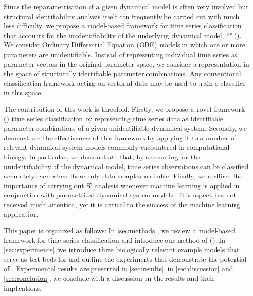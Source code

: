 Since the reparametrisation of a given dynamical model is often very involved but structural identifiability analysis itself can frequently be carried out with much less difficulty, we propose a model-based framework for time series classification that accounts for the unidentifiability of the underlying dynamical model,  %
``\myMethodFull{}" (\myMethod{}).
We consider Ordinary Differential Equation (ODE) models in which one or more parameters are unidentifiable. 
Instead of representing individual time series as parameter vectors in the original parameter space, we consider a representation in the space of structurally identifiable parameter combinations. 
Any conventional classification framework acting on vectorial data may  be used to train a classifier in this space.

The contribution of this work is threefold.
Firstly, we propose a novel framework (\myMethod{})  time series classification by representing time series data as identifiable parameter combinations of a given unidentifiable dynamical system. 
Secondly, we demonstrate the effectiveness of this framework by applying it to a number of relevant dynamical system models commonly encountered in computational biology. 
In particular, we demonstrate that, by accounting for the unidentifiability of the dynamical model, time series observations can be classified accurately even when there  only  data samples available.
Finally, we reaffirm the importance of carrying out SI analysis whenever machine learning is applied in conjunction with parametrised dynamical system models. 
This aspect has not received much attention, yet it is critical to the success of the machine learning application.

This paper is organized as follows: 
In \autoref{sec:methods}, we review a model-based framework for time series classification and introduce our method of \myMethodFull{} (\myMethod{}). 
In \autoref{sec:experiments}, we introduce three biologically relevant example models that serve as test beds for \myMethod{} and outline the experiments that demonstrate the potential of \myMethod{}.
Experimental results are presented in \autoref{sec:results}. 
 in \autoref{sec:discussion} and \autoref{sec:conclusion}, we conclude with a discussion on the results and their implications.
